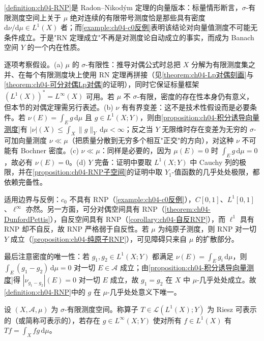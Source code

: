 \documentclass[../../main.tex]{subfiles}%
\begin{document}
\begin{remark}\label{remark:ch04-RNP定义}
\cref{definition:ch04-RNP}是 Radon--Nikodým 定理的向量版本：标量情形断言，$\sigma$-有限测度空间上关于 $\mu$ 绝对连续的有限带号测度恰是那些具有密度 $\mathrm{d}\nu/\mathrm{d}\mu\in L^1(X)$ 者；而\cref{example:ch04-c0反例}表明该结论对向量值测度不可能无条件成立。于是"RN 定理成立"不再是对测度论自动成立的事实，而成为 Banach 空间 $Y$ 的一个内在性质。

逐项考察假设。(a) $\mu$ 的 $\sigma$-有限性：推导对偶公式时总把 $X$ 分解为有限测度集之并、在每个有限测度块上使用 RN 定理再拼接（见\cref{theorem:ch04-Lp对偶刻画}与\cref{theorem:ch04-可分对偶Lp对偶}的证明），同时它保证标量框架 $(L^1(X))^*=L^\infty(X)$ 可用。若 $\mu$ 不 $\sigma$-有限，密度的存在性本身仍有意义，但本节的对偶定理需另行表述。(b) $\nu$ 有有界变差：这不是技术性假设而是必要条件。若 $\nu(E)=\int_E g\,\mathrm{d}\mu$ 且 $g\in L^1(X;Y)$，则由\cref{proposition:ch04-积分诱导向量测度}有 $|\nu|(X)\leqslant\int_X\|g\|_Y\,\mathrm{d}\mu<\infty$；反之当 $Y$ 无限维时存在变差为无穷的 $\sigma$-可加向量测度 $\nu\ll\mu$（把质量分散到无穷多个相互"正交"的方向），对这种 $\nu$ 不可能有 Bochner 密度。(c) $\nu\ll\mu$：同样是必要的，因为 $\mu(E)=0$ 时 $\int_E g\,\mathrm{d}\mu=0$，故必有 $\nu(E)=0$。(d) $Y$ 完备：证明中要取 $L^1(X;Y)$ 中 Cauchy 列的极限，并在\cref{proposition:ch04-RNP子空间}的证明中取 $Y_1$-值函数的几乎处处极限，都依赖完备性。

适用边界与反例：$c_0$ 不具有 RNP（\cref{example:ch04-c0反例}），$C[0,1]$、$L^1[0,1]$、$\ell^\infty$ 亦然。另一方面，可分对偶空间具有 RNP（\cref{theorem:ch04-DunfordPettis}），自反空间具有 RNP（\cref{corollary:ch04-自反RNP}），而 $\ell^1$ 具有 RNP 却不自反，故 RNP 严格弱于自反性。若 $\mu$ 为纯原子测度，则 RNP 对一切 $Y$ 成立（\cref{proposition:ch04-纯原子RNP}），可见障碍只来自 $\mu$ 的扩散部分。

最后注意密度的唯一性：若 $g_1,g_2\in L^1(X;Y)$ 都满足 $\nu(E)=\int_E g_i\,\mathrm{d}\mu$，则 $\int_E(g_1-g_2)\,\mathrm{d}\mu=0$ 对一切 $E\in\mathcal{A}$ 成立；由\cref{proposition:ch04-积分诱导向量测度}得 $|\nu_{g_1-g_2}|(E)=0$ 对一切 $E$ 成立，故 $g_1=g_2$ 在 $X$ 中 $\mu$-几乎处处成立。故\cref{definition:ch04-RNP}中的 $g$ 在 $\mu$-几乎处处意义下唯一。
\end{remark}

\begin{definition}\label{definition:ch04-Riesz可表示}
设 $(X,\mathcal{A},\mu)$ 为 $\sigma$-有限测度空间。称算子 $T\in\mathcal{L}(L^1(X);Y)$ 为 Riesz 可表示的（或简称可表示的），若存在 $g\in L^\infty(X;Y)$ 使对所有 $f\in L^1(X)$ 有 $Tf=\int_X fg\,\mathrm{d}\mu$。
\end{definition}
\end{document}

